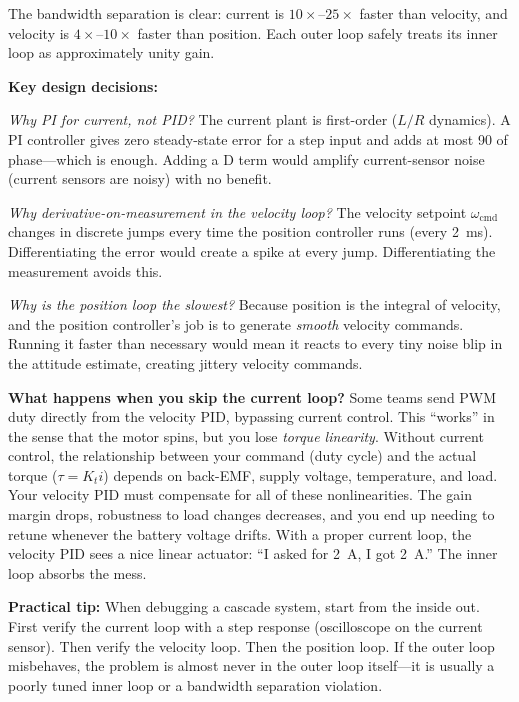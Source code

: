 \begin{mdframed}[linewidth=1pt, innertopmargin=10pt, innerbottommargin=10pt]
The bandwidth separation is clear: current is $10\times$--$25\times$ faster than velocity, and velocity is $4\times$--$10\times$ faster than position. Each outer loop safely treats its inner loop as approximately unity gain.

\textbf{Key design decisions:}

\textit{Why PI for current, not PID?} The current plant is first-order ($L/R$ dynamics). A PI controller gives zero steady-state error for a step input and adds at most 90\textdegree{} of phase---which is enough. Adding a D term would amplify current-sensor noise (current sensors are noisy) with no benefit.

\textit{Why derivative-on-measurement in the velocity loop?} The velocity setpoint $\omega_{\text{cmd}}$ changes in discrete jumps every time the position controller runs (every 2~ms). Differentiating the error would create a spike at every jump. Differentiating the measurement avoids this.

\textit{Why is the position loop the slowest?} Because position is the integral of velocity, and the position controller's job is to generate \textit{smooth} velocity commands. Running it faster than necessary would mean it reacts to every tiny noise blip in the attitude estimate, creating jittery velocity commands.

\textbf{What happens when you skip the current loop?} Some teams send PWM duty directly from the velocity PID, bypassing current control. This ``works'' in the sense that the motor spins, but you lose \textit{torque linearity}. Without current control, the relationship between your command (duty cycle) and the actual torque ($\tau = K_t i$) depends on back-EMF, supply voltage, temperature, and load. Your velocity PID must compensate for all of these nonlinearities. The gain margin drops, robustness to load changes decreases, and you end up needing to retune whenever the battery voltage drifts. With a proper current loop, the velocity PID sees a nice linear actuator: ``I asked for 2~A, I got 2~A.'' The inner loop absorbs the mess.

\textbf{Practical tip:} When debugging a cascade system, start from the inside out. First verify the current loop with a step response (oscilloscope on the current sensor). Then verify the velocity loop. Then the position loop. If the outer loop misbehaves, the problem is almost never in the outer loop itself---it is usually a poorly tuned inner loop or a bandwidth separation violation.


\end{mdframed}

